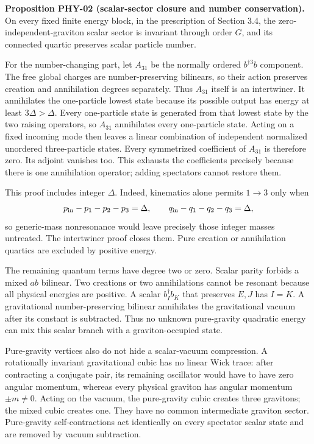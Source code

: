 \documentclass[a4paper,11pt]{article}
\numberwithin{equation}{section}
\begin{document}
\textbf{Proposition PHY-02 (scalar-sector closure and number conservation).} On every fixed finite energy block, in the prescription of Section 3.4, the zero-independent-graviton scalar sector is invariant through order \(G\), and its connected quartic preserves scalar particle number.

For the number-changing part, let \(A_{31}\) be the normally ordered \(b^{\dagger3}b\) component. The free global charges are number-preserving bilinears, so their action preserves creation and annihilation degrees separately. Thus \(A_{31}\) itself is an intertwiner. It annihilates the one-particle lowest state because its possible output has energy at least \(3\Delta>\Delta\). Every one-particle state is generated from that lowest state by the two raising operators, so \(A_{31}\) annihilates every one-particle state. Acting on a fixed incoming mode then leaves a linear combination of independent normalized unordered three-particle states. Every symmetrized coefficient of \(A_{31}\) is therefore zero. Its adjoint vanishes too. This exhausts the coefficients precisely because there is one annihilation operator; adding spectators cannot restore them.

This proof includes integer \(\Delta\). Indeed, kinematics alone permits \(1\to3\) only when \[
p_{\rm in}-p_1-p_2-p_3=\Delta,\qquad
q_{\rm in}-q_1-q_2-q_3=\Delta ,
\] so generic-mass nonresonance would leave precisely those integer masses untreated. The intertwiner proof closes them. Pure creation or annihilation quartics are excluded by positive energy.

The remaining quantum terms have degree two or zero. Scalar parity forbids a mixed \(a b\) bilinear. Two creations or two annihilations cannot be resonant because all physical energies are positive. A scalar \(b_I^\dagger b_K\) that preserves \(E,J\) has \(I=K\). A gravitational number-preserving bilinear annihilates the gravitational vacuum after its constant is subtracted. Thus no unknown pure-gravity quadratic energy can mix this scalar branch with a graviton-occupied state.

Pure-gravity vertices also do not hide a scalar-vacuum compression. A rotationally invariant gravitational cubic has no linear Wick trace: after contracting a conjugate pair, its remaining oscillator would have to have zero angular momentum, whereas every physical graviton has angular momentum \(\pm m\ne0\). Acting on the vacuum, the pure-gravity cubic creates three gravitons; the mixed cubic creates one. They have no common intermediate graviton sector. Pure-gravity self-contractions act identically on every spectator scalar state and are removed by vacuum subtraction.
\end{document}
